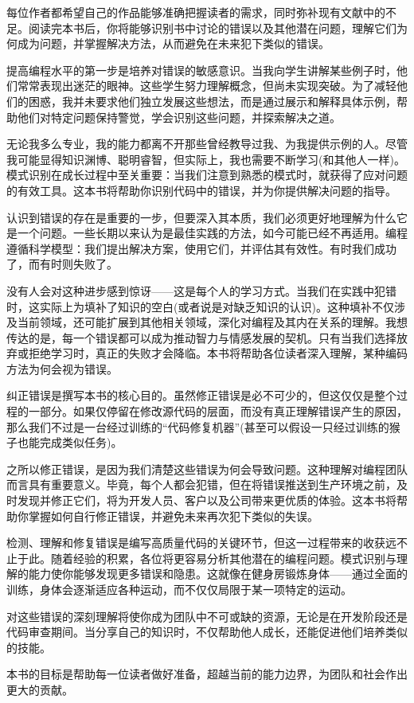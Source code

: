 每位作者都希望自己的作品能够准确把握读者的需求，同时弥补现有文献中的不足。阅读完本书后，你将能够识别书中讨论的错误以及其他潜在问题，理解它们为何成为问题，并掌握解决方法，从而避免在未来犯下类似的错误。


提高编程水平的第一步是培养对错误的敏感意识。当我向学生讲解某些例子时，他们常常表现出迷茫的眼神。这些学生努力理解概念，但尚未实现突破。为了减轻他们的困惑，我并未要求他们独立发展这些想法，而是通过展示和解释具体示例，帮助他们对特定问题保持警觉，学会识别这些问题，并探索解决之道。

无论我多么专业，我的能力都离不开那些曾经教导过我、为我提供示例的人。尽管我可能显得知识渊博、聪明睿智，但实际上，我也需要不断学习(和其他人一样)。模式识别在成长过程中至关重要：当我们注意到熟悉的模式时，就获得了应对问题的有效工具。这本书将帮助你识别代码中的错误，并为你提供解决问题的指导。


认识到错误的存在是重要的一步，但要深入其本质，我们必须更好地理解为什么它是一个问题。一些长期以来认为是最佳实践的方法，如今可能已经不再适用。编程遵循科学模型：我们提出解决方案，使用它们，并评估其有效性。有时我们成功了，而有时则失败了。

没有人会对这种进步感到惊讶——这是每个人的学习方式。当我们在实践中犯错时，这实际上为填补了知识的空白(或者说是对缺乏知识的认识)。这种填补不仅涉及当前领域，还可能扩展到其他相关领域，深化对编程及其内在关系的理解。我想传达的是，每一个错误都可以成为推动智力与情感发展的契机。只有当我们选择放弃或拒绝学习时，真正的失败才会降临。本书将帮助各位读者深入理解，某种编码方法为何会视为错误。


纠正错误是撰写本书的核心目的。虽然修正错误是必不可少的，但这仅仅是整个过程的一部分。如果仅停留在修改源代码的层面，而没有真正理解错误产生的原因，那么我们不过是一台经过训练的“代码修复机器”(甚至可以假设一只经过训练的猴子也能完成类似任务)。

之所以修正错误，是因为我们清楚这些错误为何会导致问题。这种理解对编程团队而言具有重要意义。毕竟，每个人都会犯错，但在将错误推送到生产环境之前，及时发现并修正它们，将为开发人员、客户以及公司带来更优质的体验。这本书将帮助你掌握如何自行修正错误，并避免未来再次犯下类似的失误。


检测、理解和修复错误是编写高质量代码的关键环节，但这一过程带来的收获远不止于此。随着经验的积累，各位将更容易分析其他潜在的编程问题。模式识别与理解的能力使你能够发现更多错误和隐患。这就像在健身房锻炼身体——通过全面的训练，身体会逐渐适应各种运动，而不仅仅局限于某一项特定的运动。

对这些错误的深刻理解将使你成为团队中不可或缺的资源，无论是在开发阶段还是代码审查期间。当分享自己的知识时，不仅帮助他人成长，还能促进他们培养类似的技能。

本书的目标是帮助每一位读者做好准备，超越当前的能力边界，为团队和社会作出更大的贡献。



